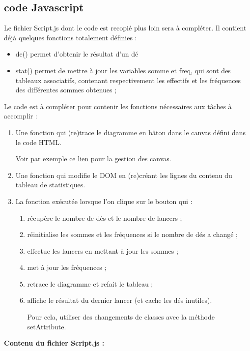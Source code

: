 \documentclass[10pt,french,A4]{article}
\theoremstyle{plain}
\begin{document}
\subsection{code Javascript}

Le fichier Script.js dont le code est recopié plus loin sera à compléter.
Il contient déjà quelques fonctions totalement définies :
\begin{itemize}
	\item de() permet d'obtenir le résultat d'un dé
	\item stat() permet de mettre à jour les variables somme et freq, qui sont des tableaux associatifs, contenant respectivement les effectifs et les fréquences des différentes sommes obtenues ;
\end{itemize}

Le code est à compléter pour contenir les fonctions nécessaires aux tâches à accomplir :

\begin{enumerate}
	\item Une fonction qui (re)trace le diagramme en bâton dans le canvas défini dans le code HTML.
	
	Voir par exemple ce \href{https://developer.mozilla.org/fr/docs/Web/API/CanvasRenderingContext2D}{lien} pour la gestion des canvas.
	\item Une fonction qui modifie le DOM en (re)créant les lignes du contenu du tableau de statistiques.
	\item La fonction exécutée lorsque l'on clique sur le bouton qui :
	\begin{enumerate}
		\item récupère le nombre de dés et le nombre de lancers ;
		\item réinitialise les sommes et les fréquences si le nombre de dés a changé ;
		\item effectue les lancers en mettant à jour les sommes ;
		\item met à jour les fréquences ;
		\item retrace le diagramme et refait le tableau ;
		\item affiche le résultat du dernier lancer (et cache les dés inutiles).
		
		Pour cela, utiliser des changements de classes avec la méthode setAttribute.
	\end{enumerate}
\end{enumerate}

\newpage

{\bfseries Contenu du fichier Script.js :}
\end{document}
